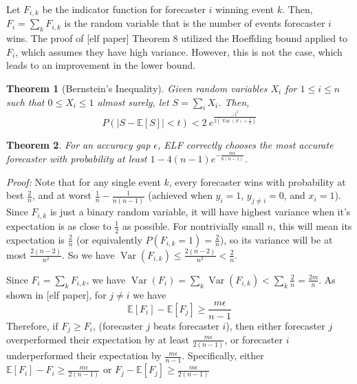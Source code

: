\documentclass[letterpaper,12pt]{article}
\DeclareMathOperator*{\Var}{Var}
\newcommand{\E}{\mathbb{E}}
\newcommand{\1}{\mathbbm{1}}
\newtheorem{theorem}{Theorem}
\begin{document}
Let $F_{i, k}$ be the indicator function for forecaster $i$ winning event $k$. Then, $F_i = \sum_k F_{i, k}$ is the random variable that is the number of events forecaster $i$ wins. The proof of [elf paper] Theorem 8 utilized the Hoeffding bound applied to $F_i$, which assumes they have high variance. However, this is not the case, which leads to an improvement in the lower bound. 
\begin{theorem}[Bernstein's Inequality]
  \label{bernstein}
  Given random variables $X_i$ for $1 \leq i \leq n$ such that $0 \leq X_i \leq 1$ almost surely, let $S = \sum_i X_i$. Then,
  \[ P\left(|S - \E[S]| < t\right) < 2 \: e^{\frac{-t^2 }{2\left(\Var(S) + \frac{t}{3}\right)} } \]
\end{theorem}
\begin{theorem}
  \label{elf_bound}
  For an accuracy gap $\epsilon$, ELF correctly chooses the most accurate forecaster with probability at least $1 - 4 (n-1) e^{-\frac{m \epsilon}{6(n - 1)}}$.
\end{theorem}
\emph{Proof:} Note that for any single event $k$, every forecaster wins with probability at best $\frac{2}{n}$, and at worst $\frac{1}{n} - \frac{1}{n(n-1)}$ (achieved when $y_i = 1$, $y_{j\neq i} = 0$, and $x_i = 1$). Since $F_{i, k}$ is just a binary random variable, it will have highest variance when it's expectation is as close to $\frac{1}{2}$ as possible. For nontrivially small $n$, this will mean its expectation is $\frac{2}{n}$ (or equivalently $P(F_{i, k} = 1) = \frac{2}{n}$), so its variance will be at most $\frac{2(n-2)}{n^2}$. So we have $\Var(F_{i, k}) \leq \frac{2(n-2)}{n^2} < \frac{2}{n}$. 

Since $F_i = \sum_k F_{i, k}$, we have $\Var(F_i) = \sum_k \Var(F_{i, k}) < \sum_k \frac{2}{n} = \frac{2m}{n}$. As shown in [elf paper], for $j\neq i$ we have 
\[ \E[F_i] - \E[F_j] \geq \frac{m \epsilon}{n - 1}\]
Therefore, if $F_j \geq F_i$, (forecaster $j$ beats forecaster $i$), then either forecaster $j$ overperformed their expectation by at least $\frac{m \epsilon}{2(n - 1)}$, or forecaster $i$ underperformed their expectation by $\frac{m \epsilon}{n - 1}$. Specifically, either $\E[F_i] - F_i \geq \frac{m \epsilon}{2(n - 1)}$ or $F_j - \E[F_j] \geq \frac{m \epsilon}{2(n - 1)}$
\end{document}
